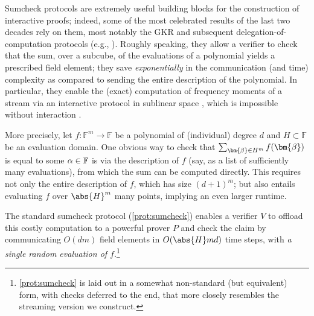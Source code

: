 \documentclass[10pt,a4paper]{article}
\theoremstyle{definition}
\newcommand{\field}{\mathbb{F}}
\newcommand{\dimension}{m}
\newcommand{\degree}{d}
\newcommand{\evaluationpoint}{\bm{\fe2}}
\newcommand{\cubeside}{H}
\def\fe#1{
    \ifnum#1=1
        \alpha
    \else
    \ifnum#1=2
        \beta
    \else
    \ifnum#1=3
        \gamma
    \fi\fi\fi
}
\begin{document}
Sumcheck protocols are extremely useful building blocks for the construction of interactive proofs; indeed, some of the most celebrated results of the last two decades rely on them, most notably the GKR \cite{GKR08} and subsequent delegation-of-computation protocols (e.g., \cite{RVW13, RRR19, RR20}). Roughly speaking, they allow a verifier to check that the sum, over a subcube, of the evaluations of a polynomial yields a prescribed field element; they save \emph{exponentially} in the communication (and time) complexity as compared to sending the entire description of the polynomial. In particular, they enable the (exact) computation of frequency moments of a stream via an interactive protocol in sublinear space \cite{CCMT14}, which is impossible without interaction \cite{AMS99}.

More precisely, let $f: \field^\dimension \to \field$ be a polynomial of (individual) degree $\degree$ and $\cubeside \subset \field$ be an evaluation domain. One obvious way to check that $\sum_{\evaluationpoint \in H^\dimension} f(\evaluationpoint)$ is equal to some $\fe1 \in \field$ is via the description of $f$ (say, as a list of sufficiently many evaluations), from which the sum can be computed directly. This requires not only the entire description of $f$, which has size $(\degree + 1)^\dimension$; but also entails evaluating $f$ over $\abs{\cubeside}^\dimension$ many points, implying an even larger runtime.

The standard sumcheck protocol (\cref{prot:sumcheck}) enables a verifier $V$ to offload this costly computation to a powerful prover $P$ and check the claim by communicating $O(\degree\dimension)$ field elements in $O(\abs{\cubeside} \dimension \degree)$ time steps, with \emph{a single random evaluation of $f$}.\footnote{\cref{prot:sumcheck} is laid out in a somewhat non-standard (but equivalent) form, with checks deferred to the end, that more closely resembles the streaming version we construct.}
\end{document}
